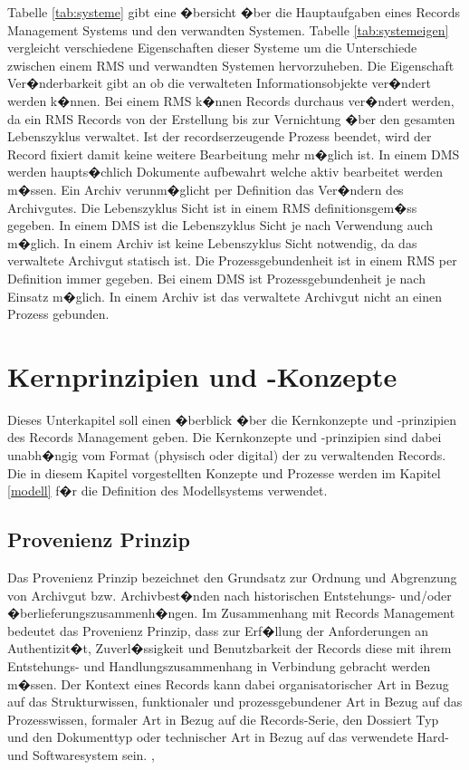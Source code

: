 \documentclass[a4paper,twoside,10pt]{report}
\begin{document}
Tabelle \ref{tab:systeme} gibt eine �bersicht �ber die Hauptaufgaben eines Records Management Systems und den verwandten Systemen. Tabelle \ref{tab:systemeigen} vergleicht verschiedene Eigenschaften dieser Systeme um die Unterschiede zwischen einem \ac{RMS} und verwandten Systemen hervorzuheben. Die Eigenschaft Ver�nderbarkeit gibt an ob die verwalteten Informationsobjekte ver�ndert werden k�nnen. Bei einem \ac{RMS} k�nnen Records durchaus ver�ndert werden, da ein \ac{RMS} Records von der Erstellung bis zur Vernichtung �ber den gesamten Lebenszyklus verwaltet. Ist der recordserzeugende Prozess beendet, wird der Record fixiert damit keine weitere Bearbeitung mehr m�glich ist. In einem \ac{DMS} werden haupts�chlich Dokumente aufbewahrt welche aktiv bearbeitet werden m�ssen. Ein Archiv verunm�glicht per Definition das Ver�ndern des Archivgutes. Die Lebenszyklus Sicht ist in einem \ac{RMS} definitionsgem�ss gegeben. In einem \ac{DMS} ist die Lebenszyklus Sicht je nach Verwendung auch m�glich. In einem Archiv ist keine Lebenszyklus Sicht notwendig, da das verwaltete Archivgut statisch ist. Die Prozessgebundenheit ist in einem \ac{RMS} per Definition immer gegeben. Bei einem \ac{DMS} ist Prozessgebundenheit je nach Einsatz m�glich. In einem Archiv ist das verwaltete Archivgut nicht an einen Prozess gebunden.


\section{Kernprinzipien und -Konzepte}\label{rmKern}

Dieses Unterkapitel soll einen �berblick �ber die Kernkonzepte und -prinzipien des Records Management geben. Die Kernkonzepte und -prinzipien sind dabei unabh�ngig vom Format (physisch oder digital) der zu verwaltenden Records. Die in diesem Kapitel vorgestellten Konzepte und Prozesse werden im Kapitel \ref{modell} f�r die Definition des Modellsystems verwendet.

\subsection{Provenienz Prinzip}
Das Provenienz Prinzip bezeichnet den Grundsatz zur Ordnung und Abgrenzung von Archivgut bzw. Archivbest�nden nach historischen Entstehungs- und/oder �berlieferungszusammenh�ngen. Im Zusammenhang mit Records Management bedeutet das Provenienz Prinzip, dass zur Erf�llung der Anforderungen an Authentizit�t, Zuverl�ssigkeit und Benutzbarkeit der Records diese mit ihrem Entstehungs- und Handlungszusammenhang in Verbindung gebracht werden m�ssen. Der Kontext eines Records kann dabei organisatorischer Art in Bezug auf das Strukturwissen, funktionaler und prozessgebundener Art in Bezug auf das Prozesswissen, formaler Art in Bezug auf die Records-Serie, den Dossiert Typ und den Dokumenttyp oder technischer Art in Bezug auf das verwendete Hard- und Softwaresystem sein. \cite{rmHandbook}, \cite{archb}
\end{document}
